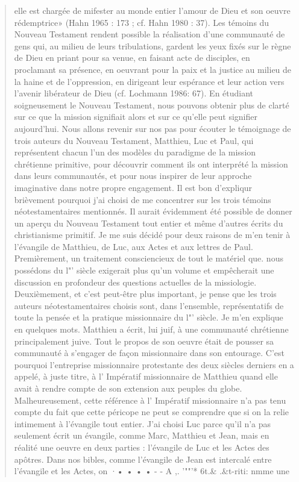 \begin{quote}
    elle est chargée de mifester au monde entier l'amour de Dieu et son
oeuvre rédemptrice» (Hahn 1965 : 173 ; cf. Hahn 1980 : 37). Les
témoins du Nouveau Testament rendent possible la réalisation d'une
communauté de gens qui, au milieu de leurs tribulations, gardent les
yeux fixés sur le règne de Dieu en priant pour sa venue, en faisant acte
de disciples, en proclamant sa présence, en oeuvrant pour la paix et la
justice au milieu de la haine et de l'oppression, en dirigeant leur
espérance et leur action vers l'avenir libérateur de Dieu (cf. Lochmann
1986: 67).
En étudiant soigneusement le Nouveau Testament, nous pouvons
obtenir plus de clarté sur ce que la mission signifiait alors et sur ce
qu'elle peut signifier aujourd'hui. Nous allons revenir sur nos pas
pour écouter le témoignage de trois auteurs du Nouveau Testament,
Matthieu, Luc et Paul, qui représentent chacun l'un des modèles du
paradigme de la mission chrétienne primitive, pour découvrir
comment ils ont interprété la mission dans leurs communautés, et pour
nous inspirer de leur approche imaginative dans notre propre
engagement.
Il est bon d'expliqur brièvement pourquoi j'ai choisi de me
concentrer sur les trois témoins néotestamentaires mentionnés. Il aurait
évidemment été possible de donner un aperçu du Nouveau Testament
tout entier et même d'autres écrits du christianisme primitif. Je me suis
décidé pour deux raisons de m'en tenir à l'évangile de Matthieu, de
Luc, aux Actes et aux lettres de Paul. Premièrement, un traitement
consciencieux de tout le matériel que. nous possédons du l"' siècle
exigerait plus qu'un volume et empêcherait une discussion en
profondeur des questions actuelles de la missiologie. Deuxièmement,
et c'est peut-être plus important, je pense que les trois auteurs
néotestamentaires choisis sont, dans l'ensemble, représentatifs de toute
la pensée et la pratique missionnaire du l"' siècle. Je m'en explique en
quelques mots.
Matthieu a écrit, lui juif, à une communauté chrétienne
principalement juive. Tout le propos de son oeuvre était de pousser sa
communauté à s'engager de façon missionnaire dans son entourage.
C'est pourquoi l'entreprise missionnaire protestante des deux siècles
derniers en a appelé, à juste titre, à l' Impératif missionnaire de
Matthieu quand elle avait à rendre compte de son extension aux
peuples du globe. Malheureusement, cette référence à l' Impératif
missionnaire n'a pas tenu compte du fait que cette péricope ne peut se
comprendre que si on la relie intimement à l'évangile tout entier.
J'ai choisi Luc parce qu'il n'a pas seulement écrit un évangile,
comme Marc, Matthieu et Jean, mais en réalité une oeuvre en deux
parties : l'évangile de Luc et les Actes des apôtres. Dans nos bibles,
comme l'évangile de Jean est intercalé entre l'évangile et les Actes, on
·• • • • - - A ,. '""'* 6t.& .&t-riti: nmme une
\end{quote}

